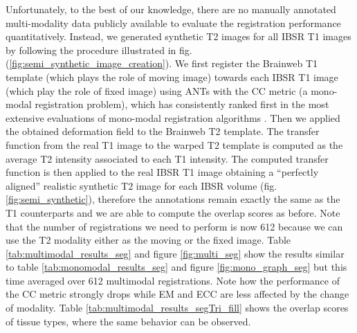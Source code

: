 
Unfortunately, to the best of our knowledge, there are no manually annotated multi-modality data publicly available to evaluate the registration performance quantitatively. Instead, we generated synthetic T2 images for all IBSR T1 images by following the procedure illustrated in fig. (\ref{fig:semi_synthetic_image_creation}). We first register the Brainweb T1 template (which plays the role of moving image) towards each IBSR T1 image (which play the role of fixed image) using ANTs with the CC metric (a mono-modal registration problem), which has consistently ranked first in the most extensive evaluations of mono-modal registration algorithms \citep{Klein2009, Klein2010, Rohlfing2012}. Then we applied the obtained deformation field to the Brainweb T2 template. The transfer function from the real T1 image to the warped T2 template is computed as the average T2 intensity associated to each T1 intensity. The computed transfer function is then applied to the real IBSR T1 image obtaining a ``perfectly aligned'' realistic synthetic T2 image for each IBSR volume (fig. \ref{fig:semi_synthetic}), therefore the annotations remain exactly the same as the T1 counterparts and we are able to compute the overlap scores as before. Note that the number of registrations we need to perform is now 612 because we can use the T2 modality either as the moving or the fixed image. Table \ref{tab:multimodal_results_seg} and figure \ref{fig:multi_seg} show the results similar to table \ref{tab:monomodal_results_seg} and figure \ref{fig:mono_graph_seg} but this time averaged over 612 multimodal registrations. Note how the performance of the CC metric strongly drops while EM and ECC are less affected by the change of modality. Table \ref{tab:multimodal_results_segTri_fill} shows the overlap scores of tissue types, where the same behavior can be observed.\\

